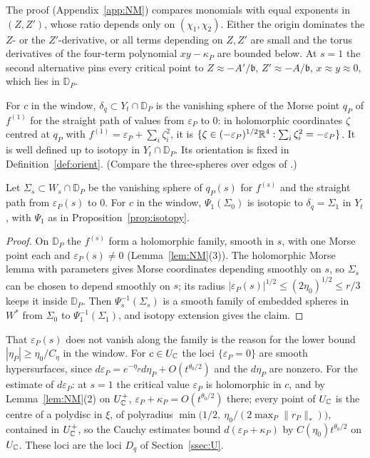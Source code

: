 The proof (Appendix~\ref{app:NM}) compares monomials with equal exponents in $(Z,Z')$, whose ratio depends only on
$(\chi_1,\chi_2)$. Either the origin dominates the $Z$- or the $Z'$-derivative, or all terms depending on $Z,Z'$ are
small and the torus derivatives of the four-term polynomial $xy-\kappa_P$ are bounded below. At $s=1$ the second
alternative pins every critical point to $Z\approx-A'/\mathfrak b$, $Z'\approx-A/\mathfrak b$, $x\approx y\approx0$, which
lies in $\mathbb D_P$.

\begin{definition}\label{def:deltaq}
For $c$ in the window, $\delta_q\subset Y_t\cap\mathbb D_P$ is the vanishing sphere of the Morse point $q_P$ of $f^{(1)}$
for the straight path of values from $\varepsilon_P$ to $0$: in holomorphic coordinates $\zeta$ centred at $q_P$ with
$f^{(1)}=\varepsilon_P+\sum_i\zeta_i^2$, it is $\{\zeta\in(-\varepsilon_P)^{1/2}\mathbb R^4:\sum_i\zeta_i^2=-\varepsilon_P\}$. It is
well defined up to isotopy in $Y_t\cap\mathbb D_P$. Its orientation is fixed in Definition~\ref{def:orient}. (Compare the
three-spheres over edges of \cite[\S4.4]{GM18}.)
\end{definition}

\begin{lemma}\label{lem:carry}
Let $\Sigma_s\subset W_s\cap\mathbb D_P$ be the vanishing sphere of $q_P(s)$ for $f^{(s)}$ and the straight path from
$\varepsilon_P(s)$ to $0$. For $c$ in the window, $\Psi_1(\Sigma_0)$ is isotopic to $\delta_q=\Sigma_1$ in $Y_t$, with
$\Psi_1$ as in Proposition~\ref{prop:isotopy}.
\end{lemma}

\begin{proof}
On $\mathbb D_P$ the $f^{(s)}$ form a holomorphic family, smooth in $s$, with one Morse point each and
$\varepsilon_P(s)\neq0$ (Lemma~\ref{lem:NM}(3)). The holomorphic Morse lemma with parameters \cite[\S\S6.2, 9.6]{AGZV1} gives Morse
coordinates depending smoothly on $s$, so $\Sigma_s$ can be chosen to depend smoothly on $s$; its radius
$|\varepsilon_P(s)|^{1/2}\le(2\eta_0)^{1/2}\le r/3$ keeps it inside $\mathbb D_P$. Then $\Psi_s^{-1}(\Sigma_s)$ is a smooth
family of embedded spheres in $W^*$ from $\Sigma_0$ to $\Psi_1^{-1}(\Sigma_1)$, and isotopy extension gives the claim.
\end{proof}

That $\varepsilon_P(s)$ does not vanish along the family is the reason for the lower bound $|\eta_P|\ge\eta_0/C_\eta$ in
the window. For $c\in U_\mathbb C$ the loci $\{\varepsilon_P=0\}$ are smooth hypersurfaces, since
$d\varepsilon_P=e^{-\eta_P}d\eta_P+O(t^{\theta_0/2})$ and the $d\eta_P$ are nonzero. For the estimate of $d\varepsilon_P$: at
$s=1$ the critical value $\varepsilon_P$ is holomorphic in $c$, and by Lemma~\ref{lem:NM}(2) on $U^+_\mathbb C$,
$\varepsilon_P+\kappa_P=O(t^{\theta_0/2})$ there; every point of $U_\mathbb C$ is the centre of a polydisc in $\xi$, of polyradius
$\min\bigl(1/2,\ \eta_0/(2\max_P\|r_P\|_*)\bigr)$, contained in $U^+_\mathbb C$, so the Cauchy estimates bound
$d(\varepsilon_P+\kappa_P)$ by $C(\eta_0)t^{\theta_0/2}$ on $U_\mathbb C$. These loci are the loci $D_q$ of
Section~\ref{ssec:U}.

